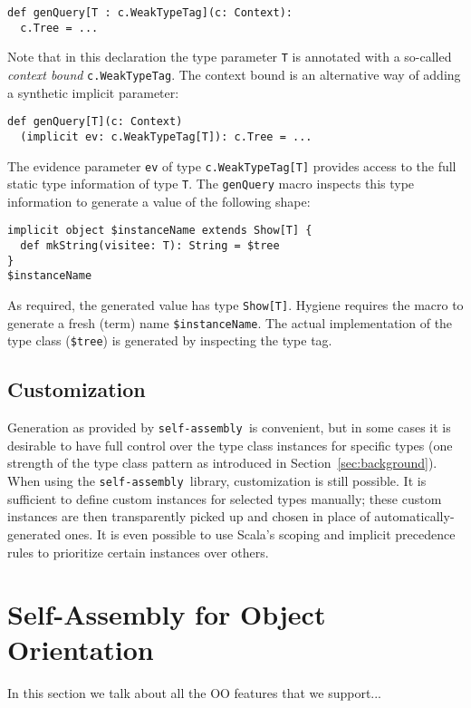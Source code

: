 \documentclass[preprint]{sigplanconf}
\newcommand{\selfassembly}{\texttt{self-assembly~}}
\begin{document}
\begin{lstlisting}
def genQuery[T : c.WeakTypeTag](c: Context):
  c.Tree = ...
\end{lstlisting}
\noindent
Note that in this declaration the type parameter \verb|T| is annotated with a
so-called \emph{context bound} \verb|c.WeakTypeTag|. The context bound is an
alternative way of adding a synthetic implicit parameter:

\begin{lstlisting}
def genQuery[T](c: Context)
  (implicit ev: c.WeakTypeTag[T]): c.Tree = ...
\end{lstlisting}
\noindent
The evidence parameter \verb|ev| of type \verb|c.WeakTypeTag[T]| provides
access to the full static type information of type \verb|T|. The
\verb|genQuery| macro inspects this type information to generate a value of
the following shape:

\begin{lstlisting}
implicit object $instanceName extends Show[T] {
  def mkString(visitee: T): String = $tree
}
$instanceName
\end{lstlisting}
\noindent
As required, the generated value has type \verb|Show[T]|. Hygiene requires the
macro to generate a fresh (term) name \verb|$instanceName|. The actual
implementation of the type class (\verb|$tree|) is generated by inspecting the
type tag.

\subsection{Customization}
\label{sec:customization}

Generation as provided by \selfassembly is convenient, but in some cases it is desirable
to have full control over the type class instances for specific types (one strength of the
type class pattern as introduced in Section~\ref{sec:background}). When using the
\selfassembly library, customization is still possible. It is sufficient to define
custom instances for selected types manually; these custom instances are then transparently
picked up and chosen in place of automatically-generated ones. It is even possible to
use Scala's scoping and implicit precedence rules to prioritize certain instances over
others.

\section{Self-Assembly for Object Orientation}

In this section we talk about all the OO features that we support...
\end{document}
